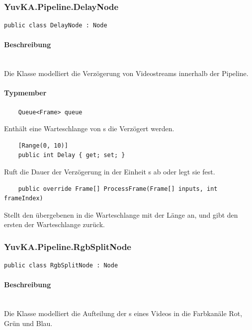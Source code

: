 \subsubsection{YuvKA.Pipeline.DelayNode}

\begin{verbatim}
public class DelayNode : Node
\end{verbatim}

\paragraph{Beschreibung}~\\
Die Klasse  modelliert die Verzögerung von Videostreams innerhalb der Pipeline.

\paragraph{Typmember}
\begin{itemize}

	\begin{verbatim}
	Queue<Frame> queue
	\end{verbatim}
	Enthält eine Warteschlange von s die Verzögert werden.
	
	\begin{verbatim}
	[Range(0, 10)]
	public int Delay { get; set; }
	\end{verbatim}
	Ruft die Dauer der Verzögerung in der Einheit s ab oder legt sie fest.

	\begin{verbatim}
	public override Frame[] ProcessFrame(Frame[] inputs, int frameIndex)
	\end{verbatim}
	Stellt den übergebenen  in die Warteschlange  mit der Länge  an, und gibt den ersten  der Warteschlange zurück.
	
\end{itemize}

\subsubsection{YuvKA.Pipeline.RgbSplitNode}

\begin{verbatim}
public class RgbSplitNode : Node
\end{verbatim}

\paragraph{Beschreibung}~\\
Die Klasse  modelliert die Aufteilung der s eines Videos in die Farbkanäle Rot, Grün und Blau.

